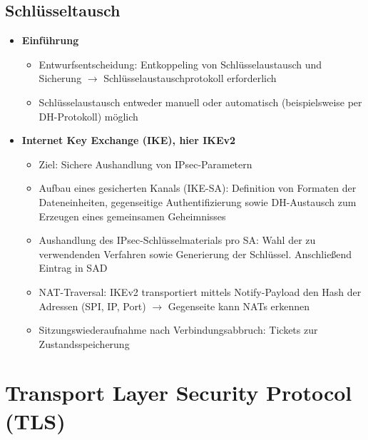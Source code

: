 \subsection{Schlüsseltausch}
\begin{itemize}
	\item \textbf{Einführung}
	\begin{itemize}
		\item Entwurfsentscheidung: Entkoppeling von Schlüsselaustausch und Sicherung \(\rightarrow\) Schlüsselaustauschprotokoll erforderlich
		\item Schlüsselaustausch entweder manuell oder automatisch (beispielsweise per DH-Protokoll) möglich
	\end{itemize}
	\item \textbf{Internet Key Exchange (IKE), hier IKEv2}
	\begin{itemize}
		\item Ziel: Sichere Aushandlung von IPsec-Parametern
		\item Aufbau eines gesicherten Kanals (IKE-SA): Definition von Formaten der Dateneinheiten, gegenseitige Authentifizierung sowie DH-Austausch zum Erzeugen eines gemeinsamen Geheimnisses
		\item Aushandlung des IPsec-Schlüsselmaterials pro SA: Wahl der zu verwendenden Verfahren sowie Generierung der Schlüssel. Anschließend Eintrag in SAD
		\item NAT-Traversal: IKEv2 transportiert mittels Notify-Payload den Hash der Adressen (SPI, IP, Port) \(\rightarrow\) Gegenseite kann NATs erkennen
		\item Sitzungswiederaufnahme nach Verbindungsabbruch: Tickets zur Zustandsspeicherung
	\end{itemize}
\end{itemize}



\section{Transport Layer Security Protocol (TLS)}

